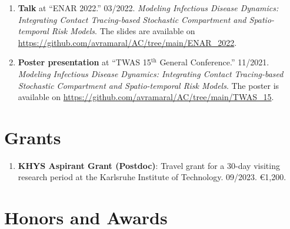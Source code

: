 \documentclass[10pt, ]{article}
\begin{document}
\begin{enumerate}[noitemsep, topsep=0pt]
		\item \textbf{Talk} at ``ENAR 2022.'' 03/2022. \textit{Modeling Infectious Disease Dynamics: Integrating Contact Tracing-based	Stochastic Compartment and Spatio-temporal Risk Models}. The slides are available on \href{https://github.com/avramaral/AC/tree/main/ENAR\_2022}{\url{https://github.com/avramaral/AC/tree/main/ENAR\_2022}}.
		
		\item \textbf{Poster presentation} at ``TWAS 15${}^{\text{th}}$ General Conference.'' 11/2021. \textit{Modeling Infectious Disease Dynamics: Integrating Contact Tracing-based	Stochastic Compartment and Spatio-temporal Risk Models}. The poster is available on \href{https://github.com/avramaral/AC/tree/main/TWAS\_15}{\url{https://github.com/avramaral/AC/tree/main/TWAS\_15}}.
	\end{enumerate}
	
	\vspace{10pt}

	\vspace{-12pt}
	\section*{Grants} \vspace{-5pt}
	
	\begin{enumerate}[noitemsep, topsep=0pt]
		\item \textbf{KHYS Aspirant Grant (Postdoc)}: Travel grant for a 30-day visiting research period at the Karlsruhe Institute of Technology. 09/2023. €1,200.
	\end{enumerate}
	
	\vspace{10pt}
	
	\vspace{-12pt}
	\section*{Honors and Awards} \vspace{-5pt}
	
\end{document}
